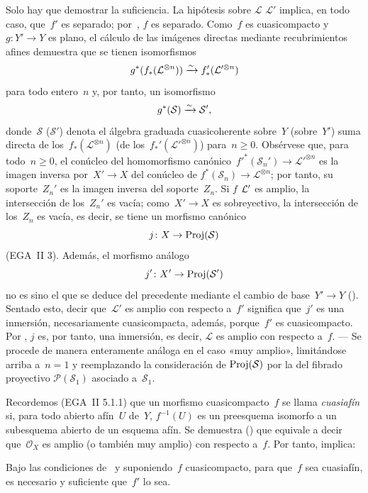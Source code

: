 Solo hay que demostrar la suficiencia. La hipótesis sobre
{$\mathcal{L}$}
{$\mathcal{L}'$}
implica, en todo caso, que~$f'$ es separado; por~, $f$ es
separado. Como~$f$ es cuasicompacto y~$g\colon Y'\to Y$ es plano, el
cálculo de las imágenes directas mediante recubrimientos afines demuestra
que se tienen isomorfismos
$$
g^*(f_*(\mathcal{L}^{\otimes n}))\isomto
f_*'(\mathcal{L}'^{\otimes n})
$$
para todo entero~$n$ y, por tanto, un isomorfismo
$$
g^*(\mathcal{S})\isomto \mathcal{S}'\quoi,
$$
donde~$\mathcal{S}$ (\resp $\mathcal{S}'$) denota el álgebra graduada
cuasicoherente sobre~$Y$ (\resp sobre~$Y'$) suma directa de
los~$f_*(\mathcal{L}^{\otimes n})$ (\resp de
los~$f_*'(\mathcal{L}'^{\otimes n})$) para~$n\geq 0$. Obsérvese que, para
todo~$n\geq 0$, el conúcleo del homomorfismo
canónico~$f'^*(\mathcal{S}_{n}')\to \mathcal{L}'^{\otimes n}$ es la
imagen inversa por~$X'\to X$ del conúcleo de
$f^*(\mathcal{S}_{n})\to \mathcal{L}^{\otimes n}$; por tanto, su
soporte~$Z_{n}'$ es la imagen inversa del soporte~$Z_{n}$. Si
{$f$}
{$\cal{L}'$}
es amplio, la intersección de los~$Z_{n}'$ es vacía; como~$X'\to X$ es
sobreyectivo, la intersección de los~$Z_{n}$ es vacía, es decir, se tiene
un morfismo canónico
$$
j\colon X\to \Proj(\mathcal{S})
$$
(EGA~II 3). Además, el morfismo análogo
$$
j'\colon X'\to \Proj(\mathcal{S}')
$$
no es sino el que se deduce del precedente mediante el cambio de
base~$Y'\to Y$ (\loccit). Sentado esto, decir que~$\mathcal{L}'$ es amplio
con respecto a~$f'$ significa que~$j'$ es una inmersión, necesariamente
cuasicompacta, además, porque~$f'$ es cuasicompacto. Por
, $j$ es, por tanto, una inmersión, es decir,
$\mathcal{L}$ es amplio con respecto a~$f$. --- Se procede de manera
enteramente análoga en el caso «muy
amplio», limitándose arriba a~$n=1$ y reemplazando la consideración de
$\Proj(\mathcal{S})$ por la del fibrado proyectivo
$\mathcal{P}(\mathcal{S}_{1})$ asociado a~$\mathcal{S}_{1}$.

Recordemos (EGA~II 5.1.1) que un morfismo cuasicompacto~$f$ se llama
\emph{cuasiafín} si, para todo abierto afín~$U$ de~$Y$, $f^{-1}(U)$ es un
preesquema isomorfo a un subesquema abierto de un esquema afín. Se
demuestra (\loccit) que equivale a decir que~$\mathcal{O}_{X}$ es amplio
(o también muy amplio) con respecto a~$f$. Por tanto, 
implica:

\begin{corollaire}
\label{VIII.5.9}
Bajo las condiciones de~ y suponiendo~$f$ cuasicompacto,
para que~$f$ sea cuasiafín, es necesario y suficiente que~$f'$ lo sea.
\end{corollaire}

